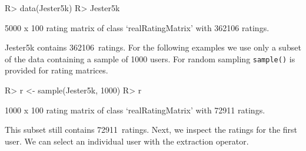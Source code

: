 \documentclass[nojss]{jss}
\newcommand{\func}[1]{\mbox{\texttt{#1()}}}
\begin{document}
\begin{Schunk}
\begin{Sinput}
R> data(Jester5k)
R> Jester5k
\end{Sinput}
\begin{Soutput}
5000 x 100 rating matrix of class ‘realRatingMatrix’ with 362106 ratings.
\end{Soutput}
\end{Schunk}

Jester5k contains
362106~ratings. For the following examples we use
only a subset of the data containing a sample of 1000 users.
For random sampling \func{sample} is provided for rating matrices.

\begin{Schunk}
\begin{Sinput}
R> r <- sample(Jester5k, 1000)
R> r
\end{Sinput}
\begin{Soutput}
1000 x 100 rating matrix of class ‘realRatingMatrix’ with 72911 ratings.
\end{Soutput}
\end{Schunk}

This subset still contains 72911~ratings.
Next, we inspect the ratings for the first user. We can select
an individual user with the extraction operator.
\end{document}

